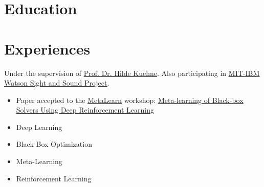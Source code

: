 \documentclass[]{deedy-resume-openfont}
\begin{document}
\begin{minipage}[t]{0.66\textwidth} 



\sectionsep
\sectionsep

\section{Education}
\sectionsep

\sectionsep



\sectionsep


\section{Experiences}

Under the supervision of \href{https://hildekuehne.github.io/}{\underline{Prof. Dr. Hilde Kuehne}}. Also participating in \href{https://sightandsound.csail.mit.edu/}{\underline{MIT-IBM Watson Sight and Sound Project}}.

\vspace{5pt}

\begin{itemize}
    \item Paper accepted to the \href{https://meta-learn.github.io/2022/}{\underline{MetaLearn}} workshop: \href{https://openreview.net/forum?id=9pO8hSVu0J}{\underline{Meta-learning of Black-box Solvers Using Deep Reinforcement Learning}} 
    \item Deep Learning
    \item Black-Box Optimization
    \item Meta-Learning
    \item Reinforcement Learning


\end{itemize}
\end{minipage}
\end{document}
